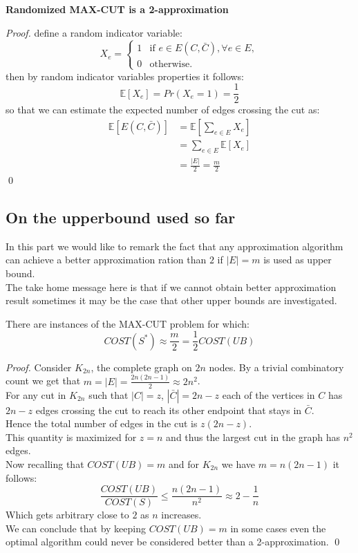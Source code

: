 \begin{theorem}{} 
	\textbf{Randomized MAX-CUT is a 2-approximation}
\end{theorem}
\begin{proof}
	define a random indicator variable:
\begin{equation*}
	X_{e} = 
	  \begin{cases}
	    1 &  \text{if } e \in E(C,\bar{C}), \forall e \in E,\\
        0 &  \text{otherwise}.
	  \end{cases}
\end{equation*}
then by random indicator variables properties it follows:
\[ \mathbb{E}[X_{e}] = Pr(X_{e} = 1) = \frac{1}{2} \]
so that we can estimate the expected number of edges crossing the cut as:
\begin{align*}
\mathbb{E}[E(C,\bar{C})] & = \mathbb{E}[\sum_{e \in E} X_{e}] \\
						 & = \sum_{e \in E} \mathbb{E}[X_{e}] \\
						 & = \frac{|E|}{2} = \frac{m}{2}
\end{align*}
\qed
\end{proof}


\subsection{On the upperbound used so far}
In this part we would like to remark the fact that any approximation algorithm can achieve a better approximation ration than $ 2 $ if $ |E|=m $ is used as upper bound.\\
The take home message here is that if we cannot obtain better approximation result sometimes it may be the case that other upper bounds are investigated.
\begin{claim}
	There are instances of the MAX-CUT problem for which:
	\[COST(S^{*}) \approx \frac{m}{2} = \frac{1}{2} COST(UB) \]
\end{claim}
\begin{proof}
Consider $ K_{2n} $, the complete graph on $ 2n $ nodes. By a trivial combinatory count we get that $ m = |E|= \frac{2n(2n-1)}{2} \approx 2n^2 $.\\
For any cut in $ K_{2n} $ such that $ |C|= z $, $ |\bar{C}|= 2n-z $ each of the vertices in $ C $ has $ 2n-z $ edges crossing the cut to reach its other endpoint that stays in $ \bar{C} $.\\
Hence the total number of edges in the cut is $ z(2n-z) $.\\
This quantity is maximized for $ z=n $ and thus the largest cut in the graph has $ n^2 $ edges.\\
Now recalling that $ COST(UB)=m $ and for $ K_{2n} $ we have $ m=n(2n-1) $ it follows:
\[ \frac{COST(UB)}{COST(S)} \leq \frac{n(2n-1)}{n^2} \approx 2 - \frac{1}{n}  \]
Which gets arbitrary close to $ 2 $ as $ n $ increases. \\
We can conclude that by keeping $ COST(UB)=m $ in some cases even the optimal algorithm could never be considered better than a 2-approximation.
\qed
\end{proof}

